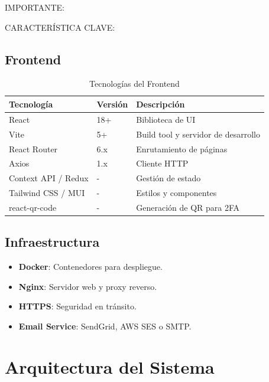 \documentclass[12pt,a4paper,oneside]{book}
\begin{document}
\begin{alert}{IMPORTANTE:}
\begin{info}{CARACTERÍSTICA CLAVE:}
\section{Frontend}
\label{sec:frontend}

\begin{table}[ht]
    \centering
    \caption{Tecnologías del Frontend}
    \begin{tabular}{@{}llp{8cm}@{}}
        \toprule
        \textbf{Tecnología} & \textbf{Versión} & \textbf{Descripción} \\
        \midrule
        React & 18+ & Biblioteca de UI \\
        Vite & 5+ & Build tool y servidor de desarrollo \\
        React Router & 6.x & Enrutamiento de páginas \\
        Axios & 1.x & Cliente HTTP \\
        Context API / Redux & - & Gestión de estado \\
        Tailwind CSS / MUI & - & Estilos y componentes \\
        react-qr-code & - & Generación de QR para 2FA \\
        \bottomrule
    \end{tabular}
\end{table}

\section{Infraestructura}
\label{sec:infraestructura}

\begin{itemize}
    \item \textbf{Docker}: Contenedores para despliegue.
    \item \textbf{Nginx}: Servidor web y proxy reverso.
    \item \textbf{HTTPS}: Seguridad en tránsito.
    \item \textbf{Email Service}: SendGrid, AWS SES o SMTP.
\end{itemize}

\chapter{Arquitectura del Sistema}
\label{cap:arquitectura}


\end{info}
\end{alert}
\end{document}

